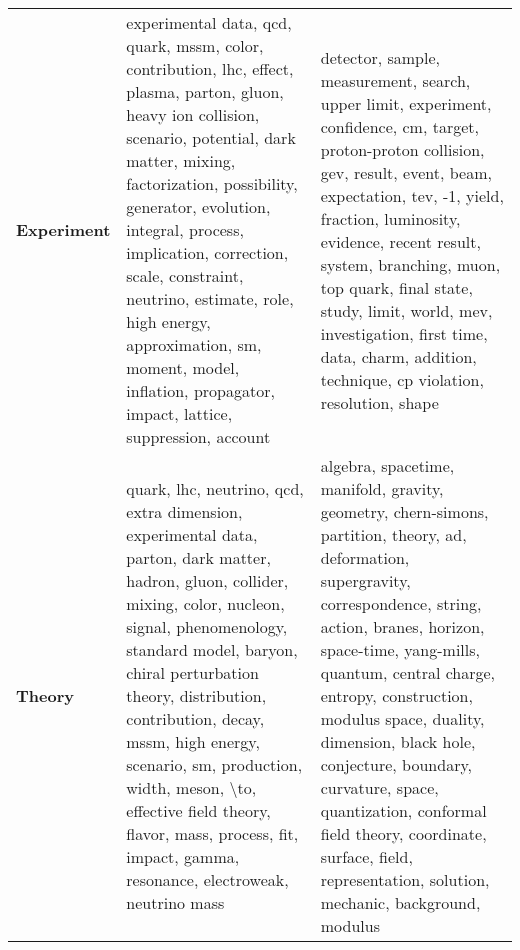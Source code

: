 \begin{longtable}{p{3cm}|p{5cm}|p{5cm}}
\bottomrule
\endlastfoot
\textbf{Experiment} &          experimental data, qcd, quark, mssm, color, contribution, lhc, effect, plasma, parton, gluon, heavy ion collision, scenario, potential, dark matter, mixing, factorization, possibility, generator, evolution, integral, process, implication, correction, scale, constraint, neutrino, estimate, role, high energy, approximation, sm, moment, model, inflation, propagator, impact, lattice, suppression, account &                                                              detector, sample, measurement, search, upper limit, experiment, confidence, cm, target, proton-proton collision, gev, result, event, beam, expectation, tev, -1, yield, fraction, luminosity, evidence, recent result, system, branching, muon, top quark, final state, study, limit, world, mev, investigation, first time, data, charm, addition, technique, cp violation, resolution, shape \\
\textbf{Theory    } &  quark, lhc, neutrino, qcd, extra dimension, experimental data, parton, dark matter, hadron, gluon, collider, mixing, color, nucleon, signal, phenomenology, standard model, baryon, chiral perturbation theory, distribution, contribution, decay, mssm, high energy, scenario, sm, production, width, meson, \textbackslash to, effective field theory, flavor, mass, process, fit, impact, gamma, resonance, electroweak, neutrino mass &  algebra, spacetime, manifold, gravity, geometry, chern-simons, partition, theory, ad, deformation, supergravity, correspondence, string, action, branes, horizon, space-time, yang-mills, quantum, central charge, entropy, construction, modulus space, duality, dimension, black hole, conjecture, boundary, curvature, space, quantization, conformal field theory, coordinate, surface, field, representation, solution, mechanic, background, modulus \\
\end{longtable}
